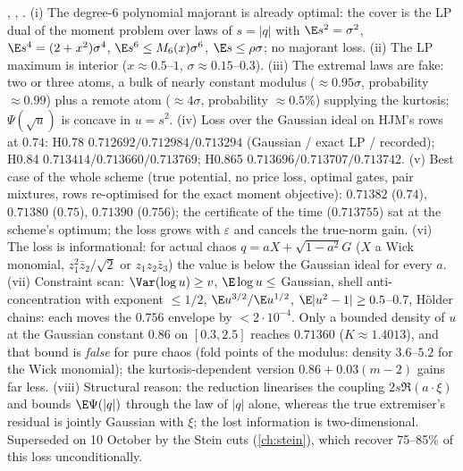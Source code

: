\begin{negative}\label{neg:residual}
, , . (i) The degree-6 polynomial majorant is already optimal: the cover is the LP
dual of the moment problem over laws of $s=|q|$ with $\E s^2=\sigma^2$, $\E s^4=(2+x^2)\sigma^4$, $\E s^6\le M_6(x)\sigma^6$, $\E s\le\rho\sigma$; no majorant loss.
(ii) The LP maximum is interior ($x\approx0.5$--$1$, $\sigma\approx0.15$--$0.3$). (iii) The extremal laws are fake: two or three atoms, a bulk of nearly
constant modulus ($\approx0.95\sigma$, probability $\approx0.99$) plus a remote atom ($\approx4\sigma$, probability $\approx0.5\%$) supplying the kurtosis;
$\Psi(\sqrt u)$ is concave in $u=s^2$. (iv) Loss over the Gaussian ideal on HJM's rows at $0.74$: H0.78 $0.712692/0.712984/0.713294$
(Gaussian / exact LP / recorded); H0.84 $0.713414/0.713660/0.713769$; H0.865 $0.713696/0.713707/0.713742$. (v) Best case of the whole scheme (true
potential, no price loss, optimal gates, pair mixtures, rows re-optimised for the exact moment objective): $0.71382$ ($0.74$), $0.71380$ ($0.75$), $0.71390$
($0.756$); the certificate of the time ($0.713755$) sat at the scheme's optimum; the loss grows with $\varepsilon$ and cancels the true-norm gain.
(vi) The loss is informational: for actual chaos $q=aX+\sqrt{1-a^2}G$ ($X$ a Wick monomial, $z_1^2\bar z_2/\sqrt2$ or $z_1z_2\bar z_3$) the value is
below the Gaussian ideal for every $a$. (vii) Constraint scan: $\Var(\log u)\ge v$, $\E\log u\le$ Gaussian, shell anti-concentration with exponent
$\le1/2$, $\E u^{3/2}/\E u^{1/2}$, $\E|u^2-1|\ge0.5$--$0.7$, Hölder chains: each moves the $0.756$ envelope by $<2\cdot10^{-4}$. Only a bounded density of
$u$ at the Gaussian constant $0.86$ on $[0.3,2.5]$ reaches $0.71360$ ($K\approx1.4013$), and that bound is \emph{false} for pure chaos (fold points of the
modulus: density $3.6$--$5.2$ for the Wick monomial); the kurtosis-dependent version $0.86+0.03(m-2)$ gains far less. (viii) Structural reason: the
reduction linearises the coupling $2s\Re(a\cdot\xi)$ and bounds $\E\Psi(|q|)$ through the law of $|q|$ alone, whereas the true extremiser's residual is
jointly Gaussian with $\xi$; the lost information is two-dimensional. Superseded on 10 October by the Stein cuts (\autoref{ch:stein}), which recover
75--85\% of this loss unconditionally.
\end{negative}

